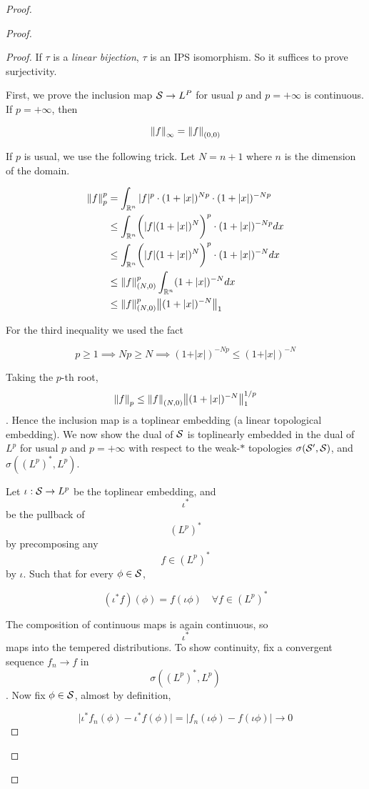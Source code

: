 \documentclass[../main-manifolds.tex]{subfiles}
\begin{document}
{{\begin{proof}
{{\begin{proof}
\begin{proof}
If $\tau$ is a \emph{linear bijection}, $\tau$ is an IPS isomorphism. So it suffices to prove surjectivity. 

First, we prove the inclusion map $\mathcal{S}\to L^P$ for usual $p$ and $p = +\infty$ is continuous. If $p = +\infty$, then 

$$
\norm{f}_{\infty}=\norm{f}_{(0,0)}
$$

If $p$ is usual, we use the following trick. Let $N = n+1$ where $n$ is the dimension of the domain. 

$$
\begin{align}
\norm{f}_{p}^{p} &= \int_{{\mathbb{R}^n}}\vert f\vert^{p} \cdot(1+\vert x\vert)^{Np}\cdot(1+\vert x\vert)^{-Np}\\
&\leq \int_{{\mathbb{R}^n}} \biggl(\vert f\vert (1+\vert x\vert )^N\biggr)^p\cdot (1+\vert x\vert )^{-Np}dx\\
&\leq \int_{{\mathbb{R}^n}} \biggl(\vert f\vert (1+\vert x\vert )^N\biggr)^p\cdot (1+\vert x\vert )^{-N}dx\\
&\leq \norm{f}_{(N,0)}^{p}\int_{{\mathbb{R}^n}}(1+\vert x\vert)^{-N}dx\\
&\leq \norm{f}_{(N,0)}^{p}\norm{(1+\vert x\vert)^{-N}}_{1}
\end{align}
$$

For the third inequality we used the fact 

$$
p\geq 1\implies Np\geq N\implies (1+\vert x\vert)^{-Np}\leq (1+\vert x \vert)^{-N}
$$

Taking the $p$-th root, $$\norm{f}_{p}\leq\norm{f}_{(N,0)}\norm{(1+\vert x\vert)^{-N}}_{1}^{1/p} $$. Hence the inclusion map is a toplinear embedding (a linear topological embedding). We now show the dual of $\mathcal{S}$ is toplinearly embedded in the dual of $L^{p}$ for usual $p$ and $p = +\infty$ with respect to the weak-$\ast$ topologies $\sigma(\mathcal{S}', \mathcal{S})$, and $\sigma((L^p)^*, L^p)$. 

Let $\iota: \mathcal{S}\to L^p$ be the toplinear embedding, and $$\iota^*$$ be the pullback of $$(L^p)^*$$ by precomposing any $$f\in (L^p)^*$$ by $\iota$. Such that for every $\phi\in\mathcal{S}$,

$$
(\iota^*f)(\phi) = f(\iota\phi)\quad\forall f\in (L^p)^*
$$

The composition of continuous maps is again continuous, so $$\iota^*$$ maps into the tempered distributions. To show continuity, fix a convergent sequence $f_n\to f$ in $$\sigma((L^p)^*, L^p)$$. Now fix $\phi\in \mathcal{S}$, almost by definition,

$$
\vert \iota^*f_n(\phi) - \iota^*f(\phi)\vert = \vert f_n(\iota\phi) - f(\iota\phi)\vert\to 0
$$


\end{proof}
\end{proof}}}
\end{proof}}}
\end{document}
